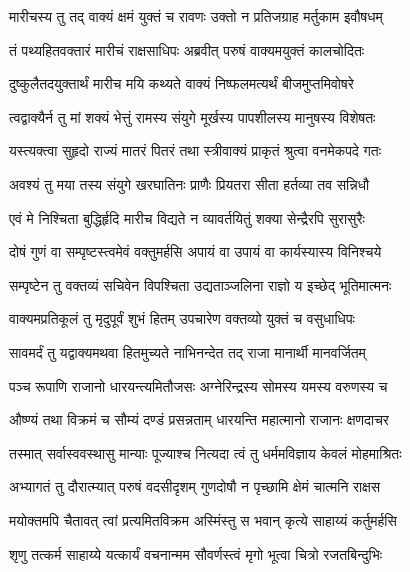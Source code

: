 
\twolineshloka
{मारीचस्य तु तद् वाक्यं क्षमं युक्तं च रावणः}
{उक्तो न प्रतिजग्राह मर्तुकाम इवौषधम्} %

\twolineshloka
{तं पथ्यहितवक्तारं मारीचं राक्षसाधिपः}
{अब्रवीत् परुषं वाक्यमयुक्तं कालचोदितः} %

\twolineshloka
{दुष्कुलैतदयुक्तार्थं मारीच मयि कथ्यते}
{वाक्यं निष्फलमत्यर्थं बीजमुप्तमिवोषरे} %

\twolineshloka
{त्वद्वाक्यैर्न तु मां शक्यं भेत्तुं रामस्य संयुगे}
{मूर्खस्य पापशीलस्य मानुषस्य विशेषतः} %

\twolineshloka
{यस्त्यक्त्वा सुहृदो राज्यं मातरं पितरं तथा}
{स्त्रीवाक्यं प्राकृतं श्रुत्वा वनमेकपदे गतः} %

\twolineshloka
{अवश्यं तु मया तस्य संयुगे खरघातिनः}
{प्राणैः प्रियतरा सीता हर्तव्या तव सन्निधौ} %

\twolineshloka
{एवं मे निश्चिता बुद्धिर्हृदि मारीच विद्यते}
{न व्यावर्तयितुं शक्या सेन्द्रैरपि सुरासुरैः} %

\twolineshloka
{दोषं गुणं वा सम्पृष्टस्त्वमेवं वक्तुमर्हसि}
{अपायं वा उपायं वा कार्यस्यास्य विनिश्चये} %

\twolineshloka
{सम्पृष्टेन तु वक्तव्यं सचिवेन विपश्चिता}
{उद्यताञ्जलिना राज्ञो य इच्छेद् भूतिमात्मनः} %

\twolineshloka
{वाक्यमप्रतिकूलं तु मृदुपूर्वं शुभं हितम्}
{उपचारेण वक्तव्यो युक्तं च वसुधाधिपः} %

\twolineshloka
{सावमर्दं तु यद्वाक्यमथवा हितमुच्यते}
{नाभिनन्देत तद् राजा मानार्थी मानवर्जितम्} %

\twolineshloka
{पञ्च रूपाणि राजानो धारयन्त्यमितौजसः}
{अग्नेरिन्द्रस्य सोमस्य यमस्य वरुणस्य च} %

\twolineshloka
{औष्ण्यं तथा विक्रमं च सौम्यं दण्डं प्रसन्नताम्}
{धारयन्ति महात्मानो राजानः क्षणदाचर} %

\twolineshloka
{तस्मात् सर्वास्ववस्थासु मान्याः पूज्याश्च नित्यदा}
{त्वं तु धर्ममविज्ञाय केवलं मोहमाश्रितः} %

\twolineshloka
{अभ्यागतं तु दौरात्म्यात् परुषं वदसीदृशम्}
{गुणदोषौ न पृच्छामि क्षेमं चात्मनि राक्षस} %

\twolineshloka
{मयोक्तमपि चैतावत् त्वां प्रत्यमितविक्रम}
{अस्मिंस्तु स भवान् कृत्ये साहाय्यं कर्तुमर्हसि} %

\twolineshloka
{शृणु तत्कर्म साहाय्ये यत्कार्यं वचनान्मम}
{सौवर्णस्त्वं मृगो भूत्वा चित्रो रजतबिन्दुभिः} %

